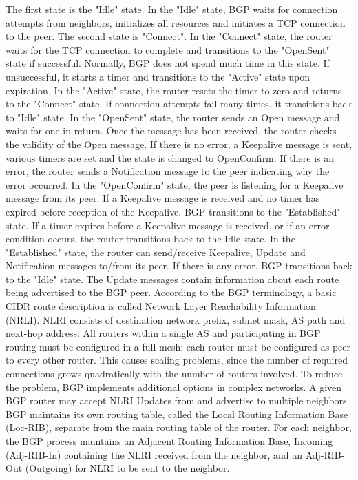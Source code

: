 \documentclass[a4paper]{article}
\begin{document}
The first state is the "Idle" state. In the "Idle" state, BGP waits for connection attempts from neighbors, initializes all resources and initiates a TCP connection to the peer. The second state is "Connect". In the "Connect" state, the router waits for the TCP connection to complete and transitions to the "OpenSent" state if successful. Normally, BGP does not spend much time in this state. If unsuccessful, it starts a timer and transitions to the "Active" state upon expiration. In the "Active" state, the router resets the timer to zero and returns to the "Connect" state. If connection attempts fail many times, it transitions back to "Idle" state. In the "OpenSent" state, the router sends an Open message and waits for one in return. Once the message has been received, the router checks the validity of the Open message. If there is no error, a Keepalive message is sent, various timers are set and the state is changed to OpenConfirm. If there is an error, the router sends a Notification message to the peer indicating why the error occurred. In the "OpenConfirm" state, the peer is listening for a Keepalive message from its peer. If a Keepalive message is received and no timer has expired before reception of the Keepalive, BGP transitions to the "Established" state. If a timer expires before a Keepalive message is received, or if an error condition occurs, the router transitions back to the Idle state. In the "Established" state, the router can send/receive Keepalive, Update and Notification messages to/from its peer. If there is any error, BGP transitions back to the "Idle" state. The Update messages contain information about each route being advertised to the BGP peer. According to the BGP terminology, a basic CIDR route description is called Network Layer Reachability Information (NRLI). NLRI consists of destination network prefix, subnet mask, AS path and next-hop address.
All routers within a single AS and participating in BGP routing must be configured in a full mesh: each router must be configured as peer to every other router. This causes scaling problems, since the number of required connections grows quadratically with the number of routers involved. To reduce the problem, BGP implements additional options in complex networks. 
A given BGP router may accept NLRI Updates from and advertise to multiple neighbors. BGP maintains its own routing table, called the Local Routing Information Base (Loc-RIB), separate from the main routing table of the router. For each neighbor, the BGP process maintains an Adjacent Routing Information Base, Incoming (Adj-RIB-In) containing the NLRI received from the neighbor, and an Adj-RIB-Out (Outgoing) for NLRI to be sent to the neighbor.
\end{document}
